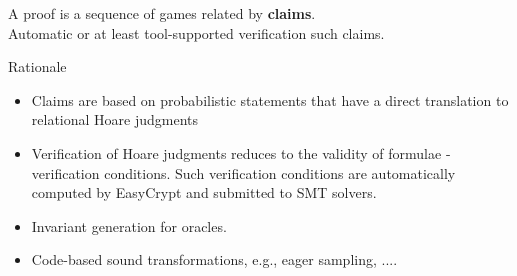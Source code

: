 \documentclass[notes,page number]{beamer}
\begin{document}
\begin{frame}{\EasyCrypt}
A proof is a sequence of games related by \textbf{claims}.\\
Automatic or at least tool-supported verification  such claims.

\begin{block}{Rationale}
\begin{itemize}
\item Claims are based on probabilistic statements that have a direct translation to 
      relational Hoare judgments
\item Verification of Hoare judgments reduces to the validity of
  formulae - verification conditions. Such verification conditions are
  automatically computed by EasyCrypt and submitted to SMT solvers.
\item Invariant generation for oracles.
\item Code-based sound transformations, e.g., eager sampling, ....
\end{itemize}
\end{block}
\end{frame}




\end{document}
